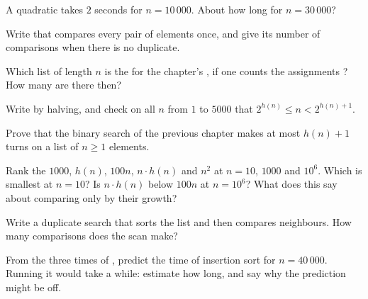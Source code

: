 \begin{exercise}[$\star\star$]\label{exo:g11:cost-of-an-algorithm:8}
A quadratic  takes $2$ seconds for $n = 10\,000$. About how long for $n = 30\,000$?
\end{exercise}

\begin{exercise}[$\star\star$]\label{exo:g11:cost-of-an-algorithm:9}
Write  that compares every pair of elements once, and give its number of comparisons when there
is no duplicate.
\end{exercise}

\begin{exercise}[$\star\star$]\label{exo:g11:cost-of-an-algorithm:10}
Which list of length $n$ is the  for the chapter's , if one counts the assignments
? How many are there then?
\end{exercise}

\begin{exercise}[$\star\star$]\label{exo:g11:cost-of-an-algorithm:11}
Write  by halving, and check on all $n$ from $1$ to $5000$ that $2^{h(n)} \le n < 2^{h(n) + 1}$.
\end{exercise}

\begin{exercise}[$\star\star\star$]\label{exo:g11:cost-of-an-algorithm:12}
Prove that the binary search of the previous chapter makes at most $h(n) + 1$ turns on a list of $n \ge 1$
elements.
\end{exercise}

\begin{exercise}[$\star\star\star$]\label{exo:g11:cost-of-an-algorithm:13}
Rank the  $1000$, $h(n)$, $100n$, $n \cdot h(n)$ and $n^2$ at $n = 10$, $1000$ and $10^6$. Which is smallest
at $n = 10$? Is $n \cdot h(n)$ below $100n$ at $n = 10^6$? What does this say about comparing  only by their
growth?
\end{exercise}

\begin{exercise}[$\star\star\star$]\label{exo:g11:cost-of-an-algorithm:14}
Write a duplicate search that sorts the list and then compares neighbours. How many comparisons does the scan make?
\end{exercise}

\begin{exercise}[$\star\star\star$]\label{exo:g11:cost-of-an-algorithm:15}
From the three times of , predict the time of insertion sort for $n = 40\,000$. Running it
would take a while: estimate how long, and say why the prediction might be off.
\end{exercise}

